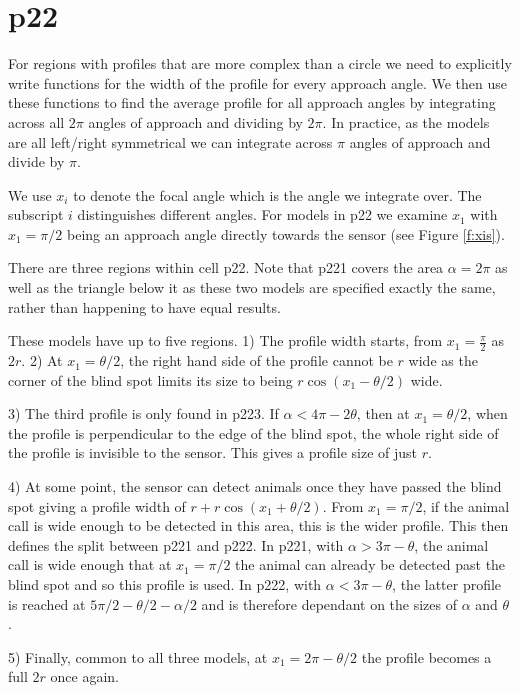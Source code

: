 \section{p22} \label{p22}

For regions with profiles that are more complex than a circle we need to explicitly write functions for the width of the profile for every approach angle. We then use these functions to find the average profile for all approach angles by integrating across all $2\pi$ angles of approach and dividing by $2\pi$. In practice, as the models are all left/right symmetrical we can integrate across $\pi$ angles of approach and divide by $\pi$.

We use $x_i$ to denote the focal angle which is the angle we integrate over. The subscript $i$ distinguishes different angles. For models in p22 we examine $x_1$ with  $x_1 = \pi/2$ being an approach angle directly towards the sensor (see Figure \ref{f:xis}).

There are three regions within cell p22. Note that p221 covers the area $\alpha=2\pi$ as well as the triangle below it as these two models are specified exactly the same, rather than happening to have equal results.

These models have up to five regions. 1) The profile width starts, from $x_1=\frac{\pi}{2}$ as $2r$. 2) At $x_1 = \theta/2$, the right hand side of the profile cannot be $r$ wide as the corner of the blind spot limits its size to being $r\cos(x_1 - \theta/2)$ wide. 

3) The third profile is only found in p223. If $\alpha < 4\pi - 2\theta$, then at $x_1=\theta/2$, when the profile is perpendicular to the edge of the blind spot, the whole right side of the profile is invisible to the sensor. This gives a profile size of just $r$.

4) At some point, the sensor can detect animals once they have passed the blind spot giving a profile width of $r + r\cos(x_1 + \theta/2)$. From $x_1=\pi/2$, if the animal call is wide enough to be detected in this area, this is the wider profile. This then defines the split between p221 and p222. In p221, with $\alpha > 3\pi - \theta$, the animal call is wide enough that at $x_1=\pi/2$ the animal can already be detected past the blind spot and so this profile is used. In p222, with $\alpha < 3\pi - \theta$, the latter profile is reached at $5\pi/2 - \theta/2 - \alpha/2$ and is therefore dependant on the sizes of $\alpha$ and $\theta$. 

5) Finally, common to all three models, at $x_1 = 2\pi - \theta/2$ the profile becomes a full $2r$ once again.


